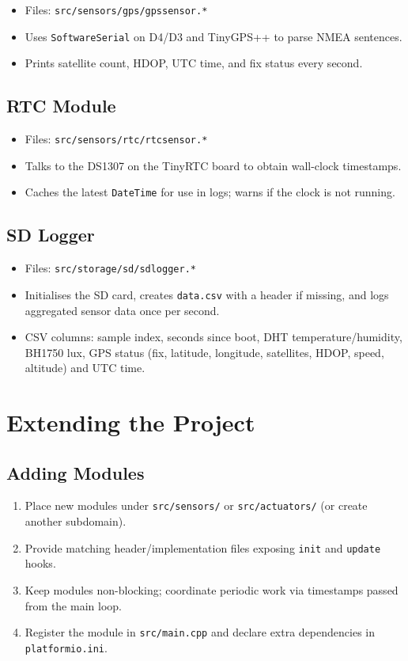\documentclass[11pt,a4paper]{article}
\begin{document}
\begin{itemize}
  \item Files: \texttt{src/sensors/gps/gpssensor.*}
  \item Uses \texttt{SoftwareSerial} on D4/D3 and TinyGPS++ to parse NMEA sentences.
  \item Prints satellite count, HDOP, UTC time, and fix status every second.
\end{itemize}

\subsection{RTC Module}

\begin{itemize}
  \item Files: \texttt{src/sensors/rtc/rtcsensor.*}
  \item Talks to the DS1307 on the TinyRTC board to obtain wall-clock timestamps.
  \item Caches the latest \texttt{DateTime} for use in logs; warns if the clock is not running.
\end{itemize}

\subsection{SD Logger}

\begin{itemize}
  \item Files: \texttt{src/storage/sd/sdlogger.*}
  \item Initialises the SD card, creates \texttt{data.csv} with a header if missing, and logs aggregated sensor data once per second.
  \item CSV columns: sample index, seconds since boot, DHT temperature/humidity, BH1750 lux, GPS status (fix, latitude, longitude, satellites, HDOP, speed, altitude) and UTC time.
\end{itemize}

\section{Extending the Project}

\subsection{Adding Modules}

\begin{enumerate}
  \item Place new modules under \texttt{src/sensors/} or \texttt{src/actuators/} (or create another subdomain).
  \item Provide matching header/implementation files exposing \texttt{init} and \texttt{update} hooks.
  \item Keep modules non-blocking; coordinate periodic work via timestamps passed from the main loop.
  \item Register the module in \texttt{src/main.cpp} and declare extra dependencies in \texttt{platformio.ini}.
\end{enumerate}
\end{document}

